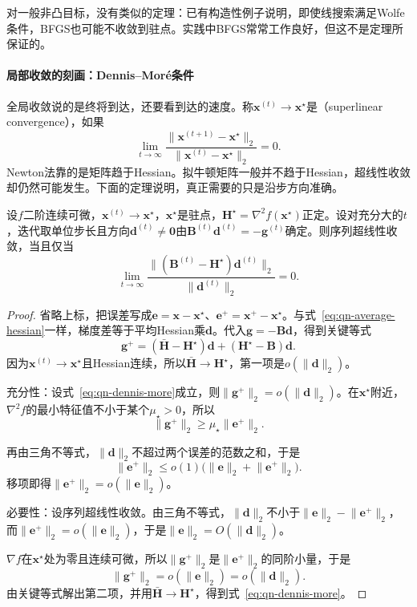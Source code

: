 对一般非凸目标，没有类似的定理：已有构造性例子说明，即使线搜索满足Wolfe条件，BFGS也可能不收敛到驻点。实践中BFGS常常工作良好，但这不是定理所保证的。

\paragraph{局部收敛的刻画：Dennis--Moré条件}
全局收敛说的是终将到达，还要看到达的速度。称$\bm{x}^{(t)}\to\bm{x}^\star$是（superlinear convergence），如果
\begin{equation}
 \lim_{t\to\infty}\frac{\lVert\bm{x}^{(t+1)}-\bm{x}^\star\rVert_2}{\lVert\bm{x}^{(t)}-\bm{x}^\star\rVert_2}=0.
 \label{eq:qn-superlinear}
\end{equation}
Newton法靠的是矩阵趋于Hessian。拟牛顿矩阵一般并不趋于Hessian，超线性收敛却仍然可能发生。下面的定理说明，真正需要的只是沿步方向准确。

\begin{theorem}
\label{thm:qn-dennis-more}
设$f$二阶连续可微，$\bm{x}^{(t)}\to\bm{x}^\star$，$\bm{x}^\star$是驻点，$\bm{H}^\star=\nabla^2f(\bm{x}^\star)$正定。设对充分大的$t$，迭代取单位步长且方向$\bm{d}^{(t)}\neq\bm{0}$由$\bm{B}^{(t)}\bm{d}^{(t)}=-\bm{g}^{(t)}$确定。则序列超线性收敛，当且仅当
\begin{equation}
 \lim_{t\to\infty}\frac{\lVert(\bm{B}^{(t)}-\bm{H}^\star)\bm{d}^{(t)}\rVert_2}{\lVert\bm{d}^{(t)}\rVert_2}=0.
 \label{eq:qn-dennis-more}
\end{equation}
\end{theorem}

\begin{proof}
省略上标，把误差写成$\bm{e}=\bm{x}-\bm{x}^\star$、$\bm{e}^{+}=\bm{x}^{+}-\bm{x}^\star$。与式~\eqref{eq:qn-average-hessian}一样，梯度差等于平均Hessian乘$\bm{d}$。代入$\bm{g}=-\bm{B}\bm{d}$，得到关键等式
\[
 \bm{g}^{+}=(\bar{\bm{H}}-\bm{H}^\star)\bm{d}+(\bm{H}^\star-\bm{B})\bm{d}.
\]
因为$\bm{x}^{(t)}\to\bm{x}^\star$且Hessian连续，所以$\bar{\bm{H}}\to\bm{H}^\star$，第一项是$o(\lVert\bm{d}\rVert_2)$。

充分性：设式~\eqref{eq:qn-dennis-more}成立，则$\lVert\bm{g}^{+}\rVert_2=o(\lVert\bm{d}\rVert_2)$。在$\bm{x}^\star$附近，$\nabla^2f$的最小特征值不小于某个$\mu_{\star}>0$，所以
\[
 \lVert\bm{g}^{+}\rVert_2\geq\mu_{\star}\lVert\bm{e}^{+}\rVert_2.
\]

再由三角不等式，$\lVert\bm{d}\rVert_2$不超过两个误差的范数之和，于是
\[
 \lVert\bm{e}^{+}\rVert_2\leq o(1)\bigl(\lVert\bm{e}\rVert_2+\lVert\bm{e}^{+}\rVert_2\bigr).
\]
移项即得$\lVert\bm{e}^{+}\rVert_2=o(\lVert\bm{e}\rVert_2)$。

必要性：设序列超线性收敛。由三角不等式，$\lVert\bm{d}\rVert_2$不小于$\lVert\bm{e}\rVert_2-\lVert\bm{e}^{+}\rVert_2$，而$\lVert\bm{e}^{+}\rVert_2=o(\lVert\bm{e}\rVert_2)$，于是$\lVert\bm{e}\rVert_2=O(\lVert\bm{d}\rVert_2)$。

$\nabla f$在$\bm{x}^\star$处为零且连续可微，所以$\lVert\bm{g}^{+}\rVert_2$是$\lVert\bm{e}^{+}\rVert_2$的同阶小量，于是
\[
 \lVert\bm{g}^{+}\rVert_2=o(\lVert\bm{e}\rVert_2)=o(\lVert\bm{d}\rVert_2).
\]
由关键等式解出第二项，并用$\bar{\bm{H}}\to\bm{H}^\star$，得到式~\eqref{eq:qn-dennis-more}。
\end{proof}

